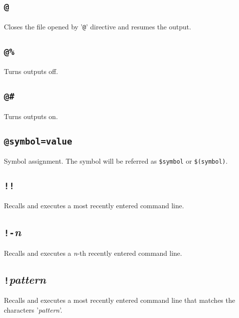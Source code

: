 \subsection*{{\tt @\GT *}}
  Closes the file opened by '{\tt @\GT}' directive and resumes the output.

\subsection*{{\tt @\%}}
  Turns outputs off.
 
\subsection*{{\tt @\#}}
  Turns outputs on.

\subsection*{{\tt @symbol=value}}
  Symbol assignment. The symbol will be referred as {\tt \$symbol} or 
  {\tt \$(symbol)}.

\subsection*{{\tt !}{\tt !}}
  Recalls and executes a most recently entered command line.

\subsection*{{\tt !-}{\it n}}
  Recalls and executes a {\it n}-th recently entered command line.

\subsection*{{\tt !}{\it pattern}}
  Recalls and executes a most recently entered command line that matches
  the characters '{\it pattern}'.





















